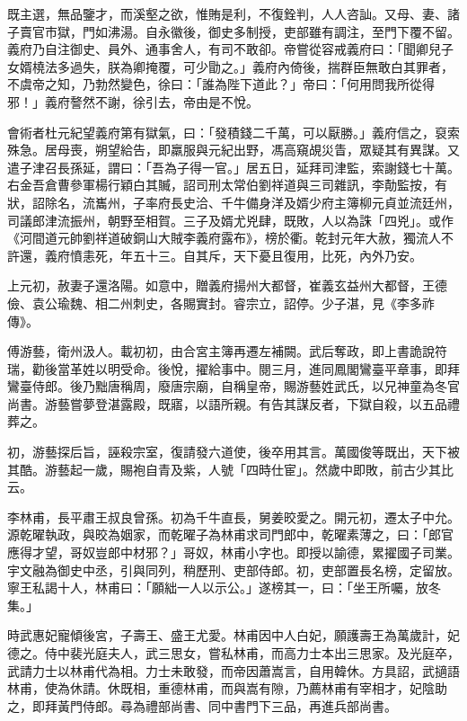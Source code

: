 \begin{pinyinscope}
 既主選，無品鑒才，而溪壑之欲，惟賄是利，不復銓判，人人咨訕。又母、妻、諸子賣官市獄，門如沸湯。自永徽後，御史多制授，吏部雖有調注，至門下覆不留。義府乃自注御史、員外、通事舍人，有司不敢卻。帝嘗從容戒義府曰：「聞卿兒子女婿橈法多過失，朕為卿掩覆，可少勖之。」義府內倚後，揣群臣無敢白其罪者，不虞帝之知，乃勃然變色，徐曰：「誰為陛下道此？」帝曰：「何用問我所從得邪！」義府謷然不謝，徐引去，帝由是不悅。



 會術者杜元紀望義府第有獄氣，曰：「發積錢二千萬，可以厭勝。」義府信之，裒索殊急。居母喪，朔望給告，即羸服與元紀出野，馮高窺覘災眚，眾疑其有異謀。又遣子津召長孫延，謂曰：「吾為子得一官。」居五日，延拜司津監，索謝錢七十萬。右金吾倉曹參軍楊行穎白其贓，詔司刑太常伯劉祥道與三司雜訊，李勣監按，有狀，詔除名，流巂州，子率府長史洽、千牛備身洋及婿少府主簿柳元貞並流廷州，司議郎津流振州，朝野至相賀。三子及婿尤兇肆，既敗，人以為誅「四兇」。或作《河間道元帥劉祥道破銅山大賊李義府露布》，榜於衢。乾封元年大赦，獨流人不許還，義府憤恚死，年五十三。自其斥，天下憂且復用，比死，內外乃安。



 上元初，赦妻子還洛陽。如意中，贈義府揚州大都督，崔義玄益州大都督，王德儉、袁公瑜魏、相二州刺史，各賜實封。睿宗立，詔停。少子湛，見《李多祚傳》。



 傅游藝，衛州汲人。載初初，由合宮主簿再遷左補闕。武后奪政，即上書詭說符瑞，勸後當革姓以明受命。後悅，擢給事中。閱三月，進同鳳閣鸞臺平章事，即拜鸞臺侍郎。後乃黜唐稱周，廢唐宗廟，自稱皇帝，賜游藝姓武氏，以兄神童為冬官尚書。游藝嘗夢登湛露殿，既寤，以語所親。有告其謀反者，下獄自殺，以五品禮葬之。



 初，游藝探后旨，誣殺宗室，復請發六道使，後卒用其言。萬國俊等既出，天下被其酷。游藝起一歲，賜袍自青及紫，人號「四時仕宦」。然歲中即敗，前古少其比云。



 李林甫，長平肅王叔良曾孫。初為千牛直長，舅姜晈愛之。開元初，遷太子中允。源乾曜執政，與晈為姻家，而乾曜子為林甫求司門郎中，乾曜素薄之，曰：「郎官應得才望，哥奴豈郎中材邪？」哥奴，林甫小字也。即授以諭德，累擢國子司業。宇文融為御史中丞，引與同列，稍歷刑、吏部侍郎。初，吏部置長名榜，定留放。寧王私謁十人，林甫曰：「願絀一人以示公。」遂榜其一，曰：「坐王所囑，放冬集。」



 時武惠妃寵傾後宮，子壽王、盛王尤愛。林甫因中人白妃，願護壽王為萬歲計，妃德之。侍中裴光庭夫人，武三思女，嘗私林甫，而高力士本出三思家。及光庭卒，武請力士以林甫代為相。力士未敢發，而帝因蕭嵩言，自用韓休。方具詔，武擿語林甫，使為休請。休既相，重德林甫，而與嵩有隙，乃薦林甫有宰相才，妃陰助之，即拜黃門侍郎。尋為禮部尚書、同中書門下三品，再進兵部尚書。




\end{pinyinscope}
